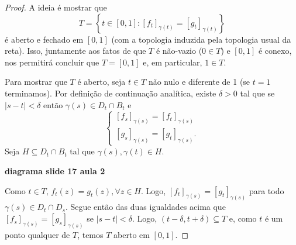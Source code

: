     \begin{proof}
        A ideia é mostrar que
        \begin{equation*}
            T = \left\{ t\in [0,1] : [f_t]_{\gamma(t)}= [g_t]_{\gamma(t)} \right\}
        \end{equation*}
        é aberto e fechado em $[0,1]$ (com a topologia induzida pela topologia usual da reta).
        Isso, juntamente aos fatos de que $T$ é não-vazio ($0\in T$) e $[0,1]$ é conexo, 
        nos permitirá concluir que $T = [0,1]$ e, em particular, $1\in T$.
        
        Para mostrar que $T$ é aberto, seja $t\in T$ não nulo e diferente de 1 
        (se $t=1$ terminamos). Por definição de continuação analítica, existe $\delta > 0$
        tal que se $|s-t|<\delta$ então $\gamma(s) \in D_t\cap B_t$ e
        \begin{equation*}
            \begin{cases}
            [f_s]_{\gamma(s)} = [f_t]_{\gamma(s)} \\
            [g_s]_{\gamma(s)} = [g_t]_{\gamma(s)}.
            \end{cases}
        \end{equation*}
        Seja $H\subseteq D_t\cap B_t$ tal que $\gamma(s), \gamma(t)\in H$. 
        \begin{center}
            \textbf{diagrama slide 17 aula 2}
        \end{center}
        Como $t\in T$,
        $f_t(z) = g_t(z), \forall z\in H$. Logo, $[f_t]_{\gamma(s)} = [g_t]_{\gamma(s)}$
        para todo $\gamma(s)\in D_t\cap D_s$. Segue então das duas igualdades acima que
        $[f_s]_{\gamma(s)} = [g_s]_{\gamma(s)}$ se $|s-t|<\delta$. Logo, 
        $(t-\delta, t+\delta)\subseteq T$ e, como $t$ é um ponto qualquer de $T$, temos
        $T$ aberto em $[0,1]$.
        

\end{proof}
